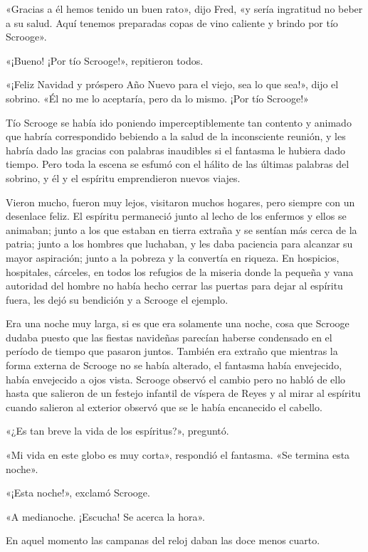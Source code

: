 \documentclass{novela}
\begin{document}
 «Gracias a él hemos tenido un buen rato», dijo Fred, «y sería ingratitud no beber a su salud. Aquí tenemos preparadas copas de vino caliente y brindo por tío Scrooge».

 «¡Bueno! ¡Por tío Scrooge!», repitieron todos.

 «¡Feliz Navidad y próspero Año Nuevo para el viejo, sea lo que sea!», dijo el sobrino. «Él no me lo aceptaría, pero da lo mismo. ¡Por tío Scrooge!»

 Tío Scrooge se había ido poniendo imperceptiblemente tan contento y animado que habría correspondido bebiendo a la salud de la inconsciente reunión, y les habría dado las gracias con palabras inaudibles si el fantasma le hubiera dado tiempo. Pero toda la escena se esfumó con el hálito de las últimas palabras del sobrino, y él y el espíritu emprendieron nuevos viajes.

 Vieron mucho, fueron muy lejos, visitaron muchos hogares, pero siempre con un desenlace feliz. El espíritu permaneció junto al lecho de los enfermos y ellos se animaban; junto a los que estaban en tierra extraña y se sentían más cerca de la patria; junto a los hombres que luchaban, y les daba paciencia para alcanzar su mayor aspiración; junto a la pobreza y la convertía en riqueza. En hospicios, hospitales, cárceles, en todos los refugios de la miseria donde la pequeña y vana autoridad del hombre no había hecho cerrar las puertas para dejar al espíritu fuera, les dejó su bendición y a Scrooge el ejemplo.

 Era una noche muy larga, si es que era solamente una noche, cosa que Scrooge dudaba puesto que las fiestas navideñas parecían haberse condensado en el período de tiempo que pasaron juntos. También era extraño que mientras la forma externa de Scrooge no se había alterado, el fantasma había envejecido, había envejecido a ojos vista. Scrooge observó el cambio pero no habló de ello hasta que salieron de un festejo infantil de víspera de Reyes y al mirar al espíritu cuando salieron al exterior observó que se le había encanecido el cabello.

 «¿Es tan breve la vida de los espíritus?», preguntó.

 «Mi vida en este globo es muy corta», respondió el fantasma. «Se termina esta noche».

 «¡Esta noche!», exclamó Scrooge.

 «A medianoche. ¡Escucha! Se acerca la hora».

 En aquel momento las campanas del reloj daban las doce menos cuarto.
\end{document}
